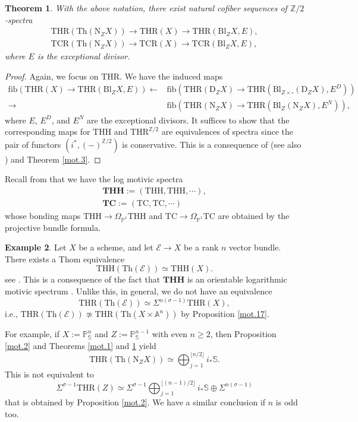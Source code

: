 \documentclass[10pt]{amsart}
\newtheorem{thm}{Theorem}[section]
\theoremstyle{definition}
\newtheorem{exm}[thm]{Example}
\theoremstyle{remark}
\numberwithin{equation}{section}
\newcommand{\A}{\mathbb{A}}
\renewcommand{\P}{\mathbb{P}}
\newcommand{\Sphere}{\mathbb{S}}
\newcommand{\Z}{\mathbb{Z}}
\newcommand{\cE}{\mathcal{E}}
\newcommand{\fib}{\mathrm{fib}}
\newcommand{\Normal}{\mathrm{N}}
\newcommand{\Blow}{\mathrm{Bl}}
\newcommand{\Th}{\mathrm{Th}}
\newcommand{\Deform}{\mathrm{D}}
\newcommand{\THH}{\mathrm{THH}}
\newcommand{\THR}{\mathrm{THR}}
\newcommand{\TC}{\mathrm{TC}}
\newcommand{\TCR}{\mathrm{TCR}}
\newcommand{\bTHH}{\mathbf{THH}}
\newcommand{\bTC}{\mathbf{TC}}
\newcommand{\Ztwo}{{\mathbb{Z}/2}}
\begin{document}
\begin{thm}
\label{mot.4}
With the above notation,
there exist natural cofiber sequences of $\Ztwo$-spectra
\begin{gather*}
\THR(\Th(\Normal_Z X))
\to
\THR(X)
\to
\THR(\Blow_Z X,E),
\\
\TCR(\Th(\Normal_Z X))
\to
\TCR(X)
\to
\TCR(\Blow_Z X,E),
\end{gather*}
where $E$ is the exceptional divisor.
\end{thm}
\begin{proof}
Again,
we focus on $\THR$.
We have the induced maps
\begin{align*}
\fib(\THR(X)\to \THR(\Blow_Z X,E))
\leftarrow &
\fib(
\THR(\Deform_Z X)
\to
\THR(\Blow_{Z\times \square}(\Deform_Z X),E^D)
)
\\
\to &
\fib(
\THR(\Normal_Z X)
\to
\THR(\Blow_Z (\Normal_Z X),E^N)
),
\end{align*}
where $E$, $E^D$, and $E^N$ are the exceptional divisors.
It suffices to show that the corresponding maps for $\THH$ and $\THR^{\Z/2}$ are equivalences of spectra since the pair of functors $(i^*,(-)^{\Ztwo})$ is conservative.
This is a consequence of \cite[Theorem 7.5.4]{logDM} (see also \cite[Theorem 3.2.14]{logSH}) and Theorem \ref{mot.3}.
\end{proof}

Recall from \cite[Definition 8.5.3]{logSH} that we have the log motivic spectra
\begin{gather*}
\bTHH:=(\THH,\THH,\cdots),
\\
\bTC:=(\TC,\TC,\cdots)
\end{gather*}
whose bonding maps $\THH\to \Omega_{\P^1}\THH$ and $\TC\to \Omega_{\P^1}\TC$ are obtained by the projective bundle formula.

\begin{exm}
\label{mot.6}
Let $X$ be a scheme,
and let $\cE\to X$ be a rank $n$ vector bundle.
There exists a Thom equivalence
\[
\THH(\Th(\cE))
\simeq
\THH(X).
\]
see \cite[Proposition 8.6.9]{logSH}.
This is a consequence of the fact that $\bTHH$ is an orientable logarithmic motivic spectrum \cite[Definition 7.1.3, Theorem 8.6.7]{logSH}.
Unlike this, in general,
we do not have an equivalence
\[
\THR(\Th(\cE))
\simeq
\Sigma^{n(\sigma-1)}\THR(X),
\]
i.e., $\THR(\Th(\cE))\not \simeq \THR(\Th(X\times \A^n))$ by Proposition \ref{mot.17}.

For example,
if $X:=\P_{\Sphere}^n$ and $Z:=\P_{\Sphere}^{n-1}$ with even $n\geq 2$,
then Proposition \ref{mot.2} and Theorems \ref{mot.1} and \ref{mot.4} yield
\[
\THR(\Th(\Normal_Z X))
\simeq
\bigoplus_{j=1}^{\lfloor n/2 \rfloor}
i_*\Sphere.
\]
This is not equivalent to
\[
\Sigma^{\sigma-1}\THR(Z)
\simeq
\Sigma^{\sigma-1}\bigoplus_{j=1}^{\lfloor (n-1)/2 \rfloor}
i_*\Sphere
\oplus
\Sigma^{n(\sigma-1)}
\]
that is obtained by Proposition \ref{mot.2}.
We have a similar conclusion if $n$ is odd too.
\end{exm}
\end{document}
